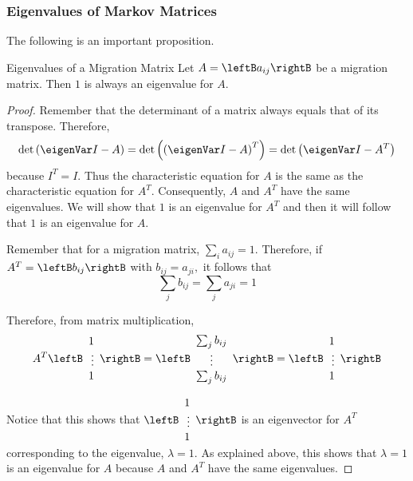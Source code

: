 \subsubsection{Eigenvalues of Markov Matrices}

The following is an important proposition.

\begin{proposition}{Eigenvalues of a Migration Matrix}\label{prop:eigenvaluemigrationmatrix}
Let $A=\leftB a_{ij}\rightB $ be a migration matrix. Then $1$ is always an
eigenvalue for $A.$
\end{proposition}

\begin{proof} Remember that the determinant of a matrix always equals that of its transpose. 
Therefore,
\begin{equation*}
\det \left( \eigenVar I - A\right) =\det \left( \left( \eigenVar I - A\right)
^{T}\right) =\det \left( \eigenVar I - A^T\right)
\end{equation*}
because $I^{T}=I.$ Thus the characteristic equation for $A$ is the same as
the characteristic equation for $A^{T}$. Consequently, $A$ and $A^{T}$ have the same
eigenvalues. We will show that $1$ is an eigenvalue for $A^{T}$ and then it
will follow that $1$ is an eigenvalue for $A$.

Remember that for a migration matrix, $\sum_{i}a_{ij}=1.$ Therefore, if 
$A^{T}=\leftB b_{ij}\rightB $ with $b_{ij}=a_{ji},$ it follows that
\begin{equation*}
\sum_{j}b_{ij}=\sum_{j}a_{ji}=1
\end{equation*}

Therefore, from matrix multiplication,
\begin{equation*}
A^{T}\leftB
\begin{array}{r}
1 \\
\vdots \\
1
\end{array}
\rightB =\leftB
\begin{array}{c}
\sum_{j}b_{ij} \\
\vdots \\
\sum_{j}b_{ij}
\end{array}
\rightB =\leftB
\begin{array}{r}
1 \\
\vdots \\
1
\end{array}
\rightB
\end{equation*}

Notice that this shows that $\leftB
\begin{array}{r}
1 \\
\vdots \\
1
\end{array}
\rightB $ is an eigenvector for $A^{T}$ corresponding to the eigenvalue, $\lambda =1.$
 As explained above, this shows that $\lambda =1$ is an
eigenvalue for $A$ because $A$ and $A^{T}$ have the same eigenvalues. 
\end{proof}